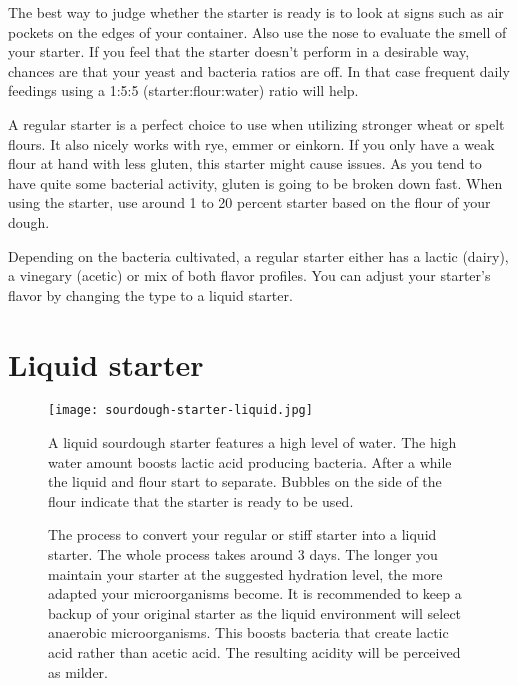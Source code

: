 The best way to judge whether the starter is ready is to look at signs such as
air pockets on the edges of your container. Also use the nose to evaluate the
smell of your starter. If you feel that the starter doesn't perform in a
desirable way, chances are that your yeast and bacteria ratios are off. In that
case frequent daily feedings using a 1:5:5 (starter:flour:water) ratio will
help.

A regular starter is a perfect choice to use when utilizing stronger wheat or spelt flours.
It also nicely works with rye, emmer or einkorn. If you only have a weak flour
at hand with less gluten, this starter might cause issues. As you tend to have
quite some bacterial activity, gluten is going to be broken down fast. When
using the starter, use around 1 to 20 percent starter based on the flour of your
dough.

Depending on the bacteria cultivated, a regular starter either has a lactic (dairy),
a vinegary (acetic) or mix of both flavor profiles. You can adjust your
starter's flavor by changing the type to a liquid starter.

\section{Liquid starter}%
\label{section:liquid-starter}

\begin{figure}[!htb]
\begin{center}
  \texttt{[image: sourdough-starter-liquid.jpg]}
  \caption{A liquid sourdough starter features a high level of water. The high
  water amount boosts lactic acid producing bacteria. After a while the liquid
  and flour start to separate. Bubbles on the side of the flour
  indicate that the starter is ready to be used.}%
  \label{fig:liquid-sourdough-starter}
\end{center}
\end{figure}


\begin{figure}[!htb]
\begin{center}
  
  \caption{The process to convert your regular or stiff starter into a liquid starter. The whole
  process takes around 3 days. The longer you maintain your starter at the
  suggested hydration level, the more adapted your microorganisms become. It is recommended
  to keep a backup of your original starter as the liquid environment will select
  anaerobic microorganisms. This boosts bacteria that create lactic acid rather
  than acetic acid. The resulting acidity will be perceived as milder.}%
  \label{fig:liquid-starter-conversion}
\end{center}
\end{figure}

